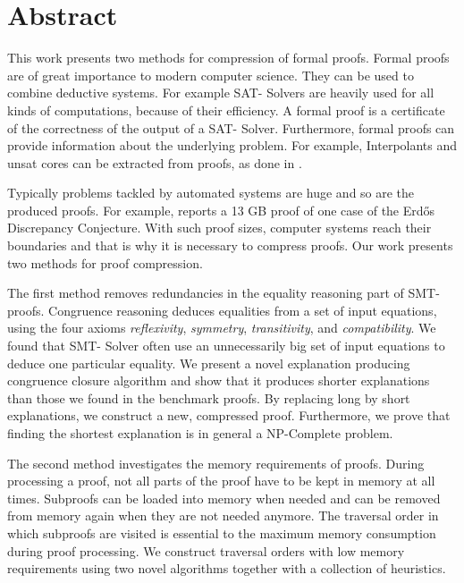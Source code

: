 \chapter*{Abstract}

This work presents two methods for compression of formal proofs.
Formal proofs are of great importance to modern computer science.
They can be used to combine deductive systems.
For example SAT- Solvers \cite{Biere2009} are heavily used for all kinds of computations, because of their efficiency.
A formal proof is a certificate of the correctness of the output of a SAT- Solver.
Furthermore, formal proofs can provide information about the underlying problem.
For example, Interpolants \cite{McMill2005} and unsat cores can be extracted from proofs, as done in \cite{Hofferek2013}.

Typically problems tackled by automated systems are huge and so are the produced proofs.
For example, \cite{Konev2014} reports a 13 GB proof of one case of the Erd\H{o}s Discrepancy Conjecture.
With such proof sizes, computer systems reach their boundaries and that is why it is necessary to compress proofs.
Our work presents two methods for proof compression.

The first method removes redundancies in the equality reasoning part of SMT- proofs.
Congruence reasoning deduces equalities from a set of input equations, using the four axioms \emph{reflexivity}, \emph{symmetry}, \emph{transitivity}, and \emph{compatibility}.
We found that SMT- Solver often use an unnecessarily big set of input equations to deduce one particular equality.
We present a novel explanation producing congruence closure algorithm and show that it produces shorter explanations than those we found in the benchmark proofs.
By replacing long by short explanations, we construct a new, compressed proof.
Furthermore, we prove that finding the shortest explanation is in general a NP-Complete problem.

The second method investigates the memory requirements of proofs.
During processing a proof, not all parts of the proof have to be kept in memory at all times.
Subproofs can be loaded into memory when needed and can be removed from memory again when they are not needed anymore.
The traversal order in which subproofs are visited is essential to the maximum memory consumption during proof processing.
We construct traversal orders with low memory requirements using two novel algorithms together with a collection of heuristics. 


